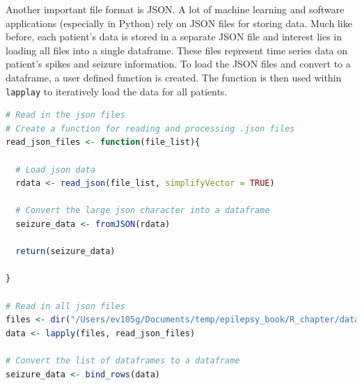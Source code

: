 Another important file format is JSON. A lot of machine learning and software applications (especially in Python) rely on JSON files for storing data. Much like before, each patient's data is stored in a separate JSON file and interest lies in loading all files into a single dataframe. These files represent time series data on patient's spikes and seizure information. To load the JSON files and convert to a dataframe, a user defined function is created. The function is then used within \verb|lapplay| to iteratively load the data for all patients.
\begin{lstlisting}[language=R]
# Read in the json files
# Create a function for reading and processing .json files
read_json_files <- function(file_list){

  # Load json data
  rdata <- read_json(file_list, simplifyVector = TRUE)

  # Convert the large json character into a dataframe
  seizure_data <- fromJSON(rdata)

  return(seizure_data)

}

# Read in all json files
files <- dir("/Users/ev105g/Documents/temp/epilepsy_book/R_chapter/data", recursive = TRUE, full.names = TRUE, pattern = "sdata.json$")
data <- lapply(files, read_json_files)

# Convert the list of dataframes to a dataframe
seizure_data <- bind_rows(data)
\end{lstlisting}


